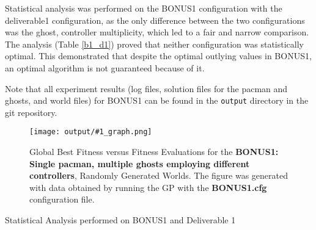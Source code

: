 \documentclass[11pt]{article}
\newcommand{\fitnessplotcaption}[2]{\caption{Global Best Fitness versus Fitness Evaluations for the \textbf{{#1}}, Randomly Generated Worlds. The figure was generated with data obtained by running the GP with the \textbf{{#2}} configuration file.}}
\newcommand{\addgraphic}[1]{\centerline{\texttt{[image: output/\#1\_graph.png]}}}
\newcommand{\tablecaption}[1]{\caption{Statistical Analysis performed on {#1}}}
\begin{document}
Statistical analysis was performed on the BONUS1 configuration with the deliverable1 configuration, as the only difference
between the two configurations was the ghost, controller multiplicity, which led to a fair and narrow comparison. 
The analysis (Table \ref{b1_d1}) proved that neither
configuration was statistically optimal. This demonstrated that despite the optimal outlying values in BONUS1, an optimal 
algorithm is not guaranteed because of it.

Note that all experiment results (log files, solution files for the pacman and ghosts, and world files) for BONUS1 can be
found in the \texttt{output} directory in the git repository.

\begin{figure}[H]
    \addgraphic{BONUS1}
    \fitnessplotcaption{BONUS1: Single pacman, multiple ghosts employing different controllers}{BONUS1.cfg}
    \label{fig:BONUS1}
\end{figure}

\begin{table}[H] 
\tablecaption{BONUS1 and Deliverable 1}        
\label{b1_d1}                 
\end{table}
\end{document}

